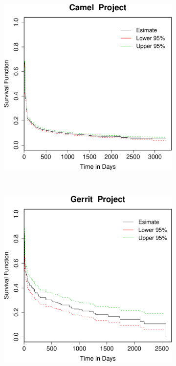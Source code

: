 \begin{figure}[t]
	\centering
	
	\begin{subfigure}[b]{0.31\textwidth}
		\includegraphics[width=\textwidth]{figures/Survival/camel.pdf}
	\end{subfigure}
	~
	~
	\begin{subfigure}[b]{0.31\textwidth}
		\includegraphics[width=\textwidth]{figures/Survival/gerrit.pdf}

\end{subfigure}
\end{figure}
